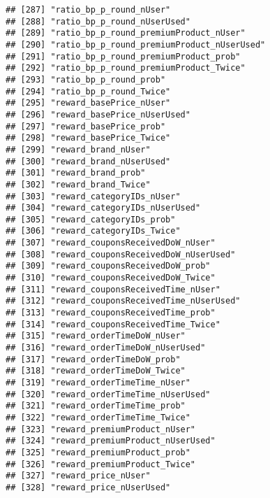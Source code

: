 \documentclass[10pt]{report}
\begin{document}
\begin{verbatim}
## [287] "ratio_bp_p_round_nUser"                             
## [288] "ratio_bp_p_round_nUserUsed"                         
## [289] "ratio_bp_p_round_premiumProduct_nUser"              
## [290] "ratio_bp_p_round_premiumProduct_nUserUsed"          
## [291] "ratio_bp_p_round_premiumProduct_prob"               
## [292] "ratio_bp_p_round_premiumProduct_Twice"              
## [293] "ratio_bp_p_round_prob"                              
## [294] "ratio_bp_p_round_Twice"                             
## [295] "reward_basePrice_nUser"                             
## [296] "reward_basePrice_nUserUsed"                         
## [297] "reward_basePrice_prob"                              
## [298] "reward_basePrice_Twice"                             
## [299] "reward_brand_nUser"                                 
## [300] "reward_brand_nUserUsed"                             
## [301] "reward_brand_prob"                                  
## [302] "reward_brand_Twice"                                 
## [303] "reward_categoryIDs_nUser"                           
## [304] "reward_categoryIDs_nUserUsed"                       
## [305] "reward_categoryIDs_prob"                            
## [306] "reward_categoryIDs_Twice"                           
## [307] "reward_couponsReceivedDoW_nUser"                    
## [308] "reward_couponsReceivedDoW_nUserUsed"                
## [309] "reward_couponsReceivedDoW_prob"                     
## [310] "reward_couponsReceivedDoW_Twice"                    
## [311] "reward_couponsReceivedTime_nUser"                   
## [312] "reward_couponsReceivedTime_nUserUsed"               
## [313] "reward_couponsReceivedTime_prob"                    
## [314] "reward_couponsReceivedTime_Twice"                   
## [315] "reward_orderTimeDoW_nUser"                          
## [316] "reward_orderTimeDoW_nUserUsed"                      
## [317] "reward_orderTimeDoW_prob"                           
## [318] "reward_orderTimeDoW_Twice"                          
## [319] "reward_orderTimeTime_nUser"                         
## [320] "reward_orderTimeTime_nUserUsed"                     
## [321] "reward_orderTimeTime_prob"                          
## [322] "reward_orderTimeTime_Twice"                         
## [323] "reward_premiumProduct_nUser"                        
## [324] "reward_premiumProduct_nUserUsed"                    
## [325] "reward_premiumProduct_prob"                         
## [326] "reward_premiumProduct_Twice"                        
## [327] "reward_price_nUser"                                 
## [328] "reward_price_nUserUsed"                             

\end{verbatim}
\end{document}
